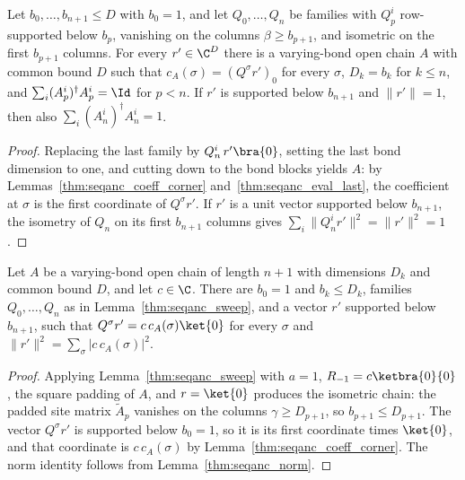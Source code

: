 \begin{lemma}
    \label{thm:seqanc_assemble}
    \leanok
    Let $b_0,\dots,b_{n+1}\le D$ with $b_0=1$, and let $Q_0,\dots,Q_n$ be
    families with $Q_p^i$ row-supported below $b_p$, vanishing on the columns
    $\beta\ge b_{p+1}$, and isometric on the first $b_{p+1}$ columns. For
    every $r'\in\C^D$ there is a varying-bond open chain $A$ with common
    bound $D$ such that $c_A(\sigma)=(Q^\sigma r')_0$ for every $\sigma$,
    $D_k=b_k$ for $k\le n$, and $\sum_i(A_p^i)^\dagger A_p^i=\Id$ for
    $p<n$. If $r'$ is supported below $b_{n+1}$ and $\|r'\|=1$,
    then also $\sum_i(A_n^i)^\dagger A_n^i=1$.
\end{lemma}
\begin{proof}
    \leanok
    Replacing the last family by $Q_n^i\,r'\bra{0}$, setting the last bond
    dimension to one, and cutting down to the bond blocks yields $A$: by Lemmas~\ref{thm:seqanc_coeff_corner}
    and~\ref{thm:seqanc_eval_last}, the coefficient at $\sigma$ is the first
    coordinate of $Q^\sigma r'$. If $r'$ is a unit vector supported below $b_{n+1}$, the isometry of
    $Q_n$ on its first $b_{n+1}$ columns gives
    $\sum_i\|Q_n^ir'\|^2=\|r'\|^2=1$.
\end{proof}

\begin{lemma}
    \label{thm:seqanc_sweep_obc}
    \leanok
    Let $A$ be a varying-bond open chain of length $n+1$ with dimensions
    $D_k$ and common bound $D$, and let $c\in\C$. There are $b_0=1$ and
    $b_k\le D_k$, families $Q_0,\dots,Q_n$ as in
    Lemma~\ref{thm:seqanc_sweep}, and a vector $r'$ supported below
    $b_{n+1}$, such that $Q^\sigma r'=c\,c_A(\sigma)\ket{0}$ for every
    $\sigma$ and $\|r'\|^2=\sum_\sigma|c\,c_A(\sigma)|^2$.
\end{lemma}
\begin{proof}
    \leanok
    Applying Lemma~\ref{thm:seqanc_sweep} with $a=1$, $R_{-1}=c\ketbra{0}{0}$,
    the square padding of $A$, and $r=\ket{0}$ produces the isometric chain: the padded site matrix
    $\widetilde A_p$ vanishes on the columns $\gamma\ge D_{p+1}$, so
    $b_{p+1}\le D_{p+1}$. The vector $Q^\sigma r'$ is supported below
    $b_0=1$, so it is its first coordinate times $\ket{0}$, and that
    coordinate is $c\,c_A(\sigma)$ by Lemma~\ref{thm:seqanc_coeff_corner}.
    The norm identity follows from Lemma~\ref{thm:seqanc_norm}.
\end{proof}

